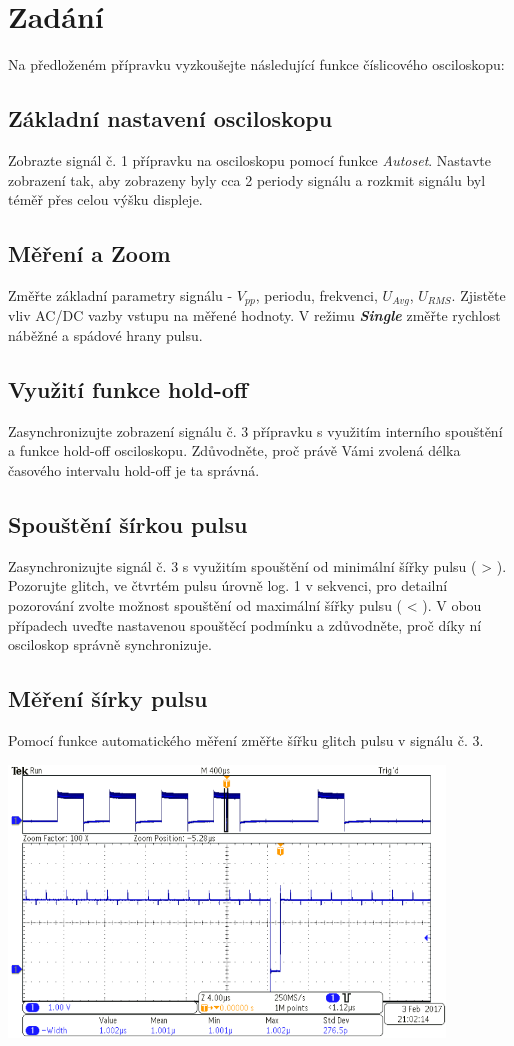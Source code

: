 
\section{Zadání}
Na předloženém přípravku vyzkoušejte následující funkce číslicového osciloskopu:

\subsection{Základní nastavení osciloskopu}
Zobrazte signál č. 1 přípravku na osciloskopu pomocí funkce \textit{Autoset}. Nastavte zobrazení tak, aby zobrazeny byly cca 2 periody signálu a rozkmit signálu byl téměř přes celou výšku displeje.

\subsection{Měření a Zoom}
Změřte základní parametry signálu - $V_{pp}$, periodu, frekvenci, $U_{Avg}$, $U_{RMS}$. Zjistěte vliv AC/DC vazby vstupu na měřené hodnoty. V režimu \textbf{\textit{Single}} změřte rychlost náběžné a spádové hrany pulsu.

\subsection{Využití funkce hold-off}
Zasynchronizujte zobrazení signálu č. 3 přípravku s využitím interního spouštění a funkce hold-off osciloskopu. Zdůvodněte, proč právě Vámi zvolená délka časového intervalu hold-off je ta správná.

\subsection{Spouštění šírkou pulsu}
Zasynchronizujte signál č. 3 s využitím spouštění od minimální šířky pulsu ( > ). Pozorujte glitch, ve čtvrtém pulsu úrovně log. 1 v sekvenci, pro detailní pozorování zvolte možnost spouštění od maximální šířky pulsu ( < ). V obou případech uveďte nastavenou spouštěcí podmínku a zdůvodněte, proč díky ní osciloskop správně synchronizuje.

\subsection{Měření šírky pulsu}
Pomocí funkce automatického měření změřte šířku glitch pulsu v signálu č. 3.

\includegraphics[width=0.87\textwidth]{images/05-zadani.png}

